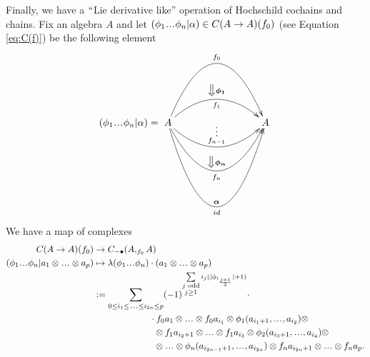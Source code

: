 Finally, we have a $``$Lie derivative like'' 
operation of Hochschild cochains and chains. 
Fix an algebra $A$ and let 
$(\phi_1\smdots \phi_n|\alpha) \in C(A \to A)(f_0)$ 
(see Equation \ref{eq:C(f)}) be the following 
element
\begin{align*}
(\phi_1\smdots \phi_n|\alpha)
= 
\xymatrix{
A \ar@/^5pc/[rrr]^{f_0} 
\ar@/^2pc/[rrr]^{\bm{\big\Downarrow \phi_1}}_{f_1} 
\ar@/_2pc/[rrr]^{\substack{\vdots\\ f_{n-1}}}
\ar@/_4pc/[rrr]^{\bm{\big\Downarrow \phi_n}}_{f_n}
\ar@/_7pc/[rrr]_{id}^{\substack{\bm{\alpha}\\}}
&&& A
}
\end{align*}
We have a map of complexes 
\begin{align*}
C(A \to A)(f_0)
&\to
C_{-\bullet}(A, _{f_0}A)\\
(\phi_1\smdots \phi_n|
  a_1 \otimes \smdots \otimes a_p)
&\mapsto
\lambda(\phi_1\smdots \phi_n)\cdot 
  (a_1 \otimes \smdots \otimes a_p)\\
&:=
\sum \limits_{0 \leq i_1 \leq \smdots \leq i_{2n} \leq p}
(-1)^{\sum \limits_{\substack{
  j \textrm{ odd}\\
  j \geq 1}}
  i_j(|\phi_{i_{\frac{j+1}{2}}}| + 1)} \cdot\\ 
&\phantom{{}moveovermov{}}  
\cdot f_0a_1 \otimes \smdots \otimes f_0a_{i_1} \otimes 
\phi_1(a_{i_1+1}, \smdots, a_{i_2}) \otimes \\
&\phantom{{}moveovermove{}}
\otimes f_1a_{i_2+1} \otimes \smdots \otimes f_1a_{i_3} \otimes 
\phi_2(a_{i_3+1}, \smdots, a_{i_4}) \otimes \\
&\phantom{{}moveovermove{}}
\otimes \smdots \otimes
\phi_n(a_{i_{2n-1}+1}, \smdots, a_{i_{2n}}) \otimes
f_na_{i_{2n}+1} \otimes \smdots \otimes f_na_p.
\end{align*}
%
